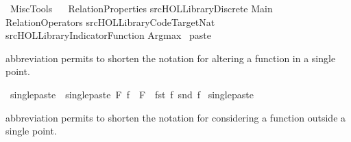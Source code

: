 %
\begin{isabellebody}%
\def\isabellecontext{MiscTools}%
%
\isamarkuptrue%
%
\isadelimtheory
%
\endisadelimtheory
%
\isatagtheory
{}\isamarkupfalse%
\ MiscTools\ \isanewline
\isanewline
{}\ \isanewline
RelationProperties\isanewline
{\isachardoublequoteopen}{\isachartilde}{\isachartilde}{\isacharslash}src{\isacharslash}HOL{\isacharslash}Library{\isacharslash}Discrete{\isachardoublequoteclose}\isanewline
Main\isanewline
RelationOperators\isanewline
{\isachardoublequoteopen}{\isachartilde}{\isachartilde}{\isacharslash}src{\isacharslash}HOL{\isacharslash}Library{\isacharslash}Code{\isacharunderscore}Target{\isacharunderscore}Nat{\isachardoublequoteclose}\isanewline
{\isachardoublequoteopen}{\isachartilde}{\isachartilde}{\isacharslash}src{\isacharslash}HOL{\isacharslash}Library{\isacharslash}Indicator{\isacharunderscore}Function{\isachardoublequoteclose}\isanewline
Argmax\isanewline
\isanewline
{}%
\endisatagtheory
{\isafoldtheory}%
%
\isadelimtheory
%
\endisadelimtheory
%
\isamarkuptrue%
\isamarkupfalse%
\ paste\ {\isacharparenleft}\ {\isachardoublequoteopen}{\isacharplus}{\isacharless}{\isachardoublequoteclose}\ {}{}{\isacharparenright}%
\begin{isamarkuptext}%
\isa{{\isacharplus}{\isacharless}} abbreviation permits to shorten the notation for altering a function in a single point.%
\end{isamarkuptext}%
\isamarkuptrue%
\isamarkupfalse%
\ singlepaste\ \ {\isachardoublequoteopen}singlepaste\ F\ f\ {\isacharequal}{\isacharequal}\ F\ {\isacharplus}{\isacharasterisk}\ {\isacharbraceleft}{\isacharparenleft}fst\ f{\isacharcomma}\ snd\ f{\isacharparenright}{\isacharbraceright}{\isachardoublequoteclose}\isanewline
{}\isamarkupfalse%
\ singlepaste\ {\isacharparenleft}\ {\isachardoublequoteopen}{\isacharplus}{\isacharless}{\isachardoublequoteclose}\ {}{}{\isacharparenright}%
\begin{isamarkuptext}%
\isa{{\isacharminus}{\isacharminus}} abbreviation permits to shorten the notation for considering a function outside a single point.%
\end{isamarkuptext}%
\isamarkuptrue%
\isamarkupfalse%

\end{isabellebody}
